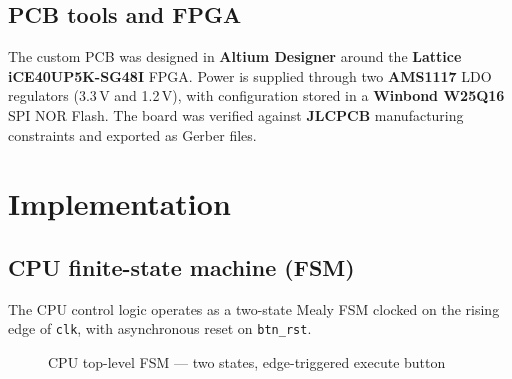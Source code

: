 \documentclass[11pt,a4paper]{article}
\begin{document}
\subsection{PCB tools and FPGA}

The custom PCB was designed in \textbf{Altium Designer} around the
\textbf{Lattice iCE40UP5K-SG48I} FPGA. Power is supplied through two
\textbf{AMS1117} LDO regulators (3.3\,V and 1.2\,V), with configuration
stored in a \textbf{Winbond W25Q16} SPI NOR Flash. The board was verified
against \textbf{JLCPCB} manufacturing constraints and exported as Gerber files.

\section{Implementation}
\label{sec:impl}

\subsection{CPU finite-state machine (FSM)}

The CPU control logic operates as a two-state Mealy FSM clocked on the
rising edge of \texttt{clk}, with asynchronous reset on \texttt{btn\_rst}.

\begin{figure}[H]
\centering
{}
\caption{CPU top-level FSM — two states, edge-triggered execute button}
\label{fig:fsm}
\end{figure}
\end{document}

